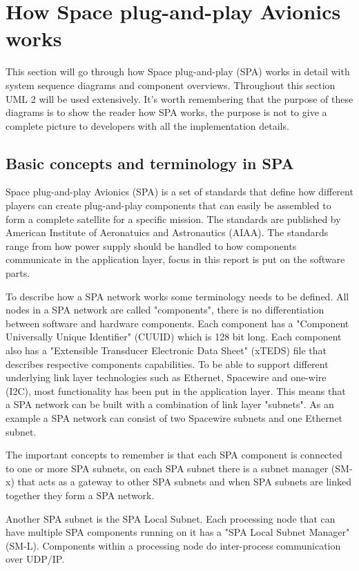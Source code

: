\chapter{How Space plug-and-play Avionics works}\label{ch:spa}
This section will go through how Space plug-and-play (SPA) works in detail with
system sequence diagrams and component overviews. Throughout this
section UML 2 will be used extensively. It's worth remembering that the
purpose of these diagrams is to show the reader how SPA works, the purpose
is not to give a complete picture to developers with all the implementation
details.

\section{Basic concepts and terminology in SPA}
Space plug-and-play Avionics (SPA) is a set of standards that define how
different players can create plug-and-play components that can easily be
assembled to form a complete satellite for a specific mission. The standards
are published by American Institute of Aeronatuics and Astronautics (AIAA). The
standards range from how power supply should be handled to how components
communicate in the application layer, focus in this report is put on the
software parts.

To describe how a SPA network works some terminology needs to be defined. All
nodes in a SPA network are called "components", there is no differentiation
between software and hardware components. Each component has a "Component
Universally Unique Identifier" (CUUID) which is 128 bit long. Each component
also has a "Extensible Transducer Electronic Data Sheet" (xTEDS) file that
describes respective components capabilities. To be able to support different
underlying link layer technologies such as Ethernet, Spacewire and one-wire
(I2C), most functionality has been put in the application layer. This means
that a SPA network can be built with a combination of link layer "subnets". As
an example a SPA network can consist of two Spacewire subnets and one Ethernet
subnet.

The important concepts to remember is that each SPA component is
connected to one or more SPA subnets, on each SPA subnet there is a subnet
manager (SM-x) that acts as a gateway to other SPA subnets and when SPA subnets
are linked together they form a SPA network.

Another SPA subnet is the SPA Local Subnet. Each processing node that can
have multiple SPA components running on it has a "SPA Local Subnet Manager"
(SM-L).  Components within a processing node do inter-process communication
over UDP/IP.

